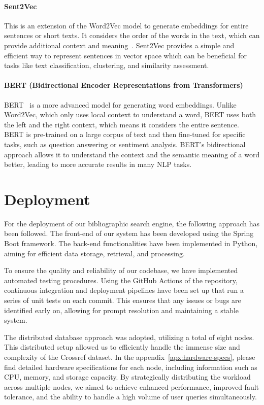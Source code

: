 \documentclass{article}
\begin{document}
\paragraph{Sent2Vec} This is an extension of the Word2Vec model to 
generate embeddings for entire sentences or short texts. It considers 
the order of the words in the text, which can provide additional 
context and meaning~\cite{MZ20}. Sent2Vec provides a simple and efficient way to 
represent sentences in vector space which can be beneficial for tasks 
like text classification, clustering, and similarity assessment.

\paragraph{BERT (Bidirectional Encoder Representations from 
Transformers)} BERT~\cite{DCLT19} is a more advanced model for 
generating word 
embeddings. Unlike Word2Vec, which only uses local context to 
understand a word, BERT uses both the left and the right context, 
which means it considers the entire sentence. BERT is pre-trained on 
a large corpus of text and then fine-tuned for specific tasks, such 
as question answering or sentiment analysis. BERT's bidirectional 
approach allows it to understand the context and the semantic meaning 
of a word better, leading to more accurate results in many NLP tasks.

\section{Deployment}
For the deployment of our bibliographic search engine, the following approach has been followed.
The front-end of our system has been developed using the Spring Boot framework.
The back-end functionalities have been implemented in Python, aiming for efficient data storage, 
retrieval, and processing. 

To ensure the quality and reliability of our codebase, we have implemented automated testing 
procedures. Using the GitHub Actions of the repository, 
continuous integration and deployment pipelines have been set up that run a series of unit tests 
on each commit. This ensures that any issues or bugs are identified early on, allowing for 
prompt resolution and maintaining a stable system.

The distributed database approach was adopted, utilizing a total of eight nodes. 
This distributed setup allowed us to efficiently handle the immense size and complexity of the 
Crossref dataset. In the appendix~\ref{apx:hardware-specs}, please find detailed hardware 
specifications for each node, including information such as CPU, memory, and storage capacity. 
By strategically distributing the workload across multiple nodes, we aimed to achieve enhanced 
performance, improved fault tolerance, and the ability to handle a high volume of user queries 
simultaneously. 
\end{document}
